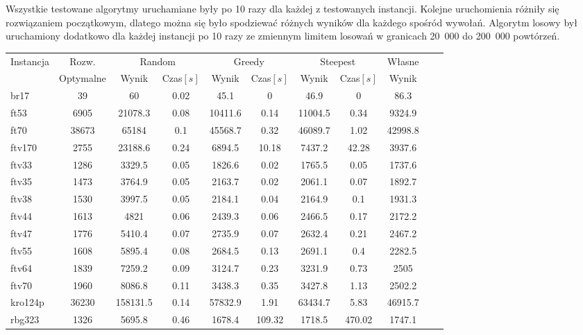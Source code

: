 Wszystkie testowane algorytmy uruchamiane
były po 10 razy dla każdej z testowanych instancji. Kolejne uruchomienia
różniły się rozwiązaniem początkowym, dlatego można się było spodziewać
różnych wyników dla każdego spośród wywołań. Algorytm 
losowy był uruchamiony dodatkowo dla każdej instancji po 10 razy ze zmiennym
limitem losowań w granicach 20~000 do 200~000 powtórzeń.

\begin{center}
\begin{table}
\begin{tabular}{lcccccccccc}

\toprule
\multirow{2}{*}{Instancja} & {Rozw.} &
\multicolumn{2}{c}{Random} & \multicolumn{2}{c}{Greedy} &
\multicolumn{2}{c}{Steepest} & Własne\\
 &  Optymalne & Wynik & Czas$[s]$& Wynik & Czas$[s]$ & Wynik & Czas$[s]$& Wynik \\
\toprule
br17 & 39 & 60 & 0.02 & 45.1 & 0 & 46.9 & 0 & 86.3 \\
\midrule
ft53 & 6905 & 21078.3 & 0.08 & 10411.6 & 0.14 & 11004.5 & 0.34 & 9324.9 \\
\midrule
ft70 & 38673 & 65184 & 0.1 & 45568.7 & 0.32 & 46089.7 & 1.02 & 42998.8 \\
\midrule
ftv170 & 2755 & 23188.6 & 0.24 & 6894.5 & 10.18 & 7437.2 & 42.28 & 3937.6 \\
\midrule
ftv33 & 1286 & 3329.5 & 0.05 & 1826.6 & 0.02 & 1765.5 & 0.05 & 1737.6 \\
\midrule
ftv35 & 1473 & 3764.9 & 0.05 & 2163.7 & 0.02 & 2061.1 & 0.07 & 1892.7 \\
\midrule
ftv38 & 1530 & 3997.5 & 0.05 & 2184.1 & 0.04 & 2164.9 & 0.1 & 1931.3 \\
\midrule
ftv44 & 1613 & 4821 & 0.06 & 2439.3 & 0.06 & 2466.5 & 0.17 & 2172.2 \\
\midrule
ftv47 & 1776 & 5410.4 & 0.07 & 2735.9 & 0.07 & 2632.4 & 0.21 & 2467.2 \\
\midrule
ftv55 & 1608 & 5895.4 & 0.08 & 2684.5 & 0.13 & 2691.1 & 0.4 & 2282.5 \\
\midrule
ftv64 & 1839 & 7259.2 & 0.09 & 3124.7 & 0.23 & 3231.9 & 0.73 & 2505 \\
\midrule
ftv70 & 1960 & 8086.8 & 0.11 & 3438.3 & 0.35 & 3427.8 & 1.13 & 2502.2 \\
\midrule
kro124p & 36230 & 158131.5 & 0.14 & 57832.9 & 1.91 & 63434.7 & 5.83 & 46915.7 \\
\midrule
rbg323 & 1326 & 5695.8 & 0.46 & 1678.4 & 109.32 & 1718.5 & 470.02 & 1747.1 \\

\end{tabular}
\end{table}
\end{center}
